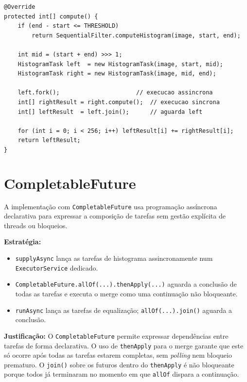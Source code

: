 \documentclass[a4paper,11pt,openright,BCOR=15mm]{scrbook}
\begin{document}
\begin{lstlisting}[caption={HistogramTask com Fork/Join}]
@Override
protected int[] compute() {
    if (end - start <= THRESHOLD)
        return SequentialFilter.computeHistogram(image, start, end);

    int mid = (start + end) >>> 1;
    HistogramTask left  = new HistogramTask(image, start, mid);
    HistogramTask right = new HistogramTask(image, mid, end);

    left.fork();                      // execucao assincrona
    int[] rightResult = right.compute();  // execucao sincrona
    int[] leftResult  = left.join();      // aguarda left

    for (int i = 0; i < 256; i++) leftResult[i] += rightResult[i];
    return leftResult;
}
\end{lstlisting}

\section{CompletableFuture}

A implementação com \texttt{CompletableFuture} usa programação assíncrona declarativa para expressar a composição de tarefas sem gestão explícita de threads ou bloqueios.

\textbf{Estratégia:}
\begin{itemize}
    \item \texttt{supplyAsync} lança as tarefas de histograma assincronamente num \texttt{ExecutorService} dedicado.
    \item \texttt{CompletableFuture.allOf(...).thenApply(...)} aguarda a conclusão de todas as tarefas e executa o merge como uma continuação não bloqueante.
    \item \texttt{runAsync} lança as tarefas de equalização; \texttt{allOf(...).join()} aguarda a conclusão.
\end{itemize}

\textbf{Justificação:} O \texttt{CompletableFuture} permite expressar dependências entre tarefas de forma declarativa. O uso de \texttt{thenApply} para o merge garante que este só ocorre após todas as tarefas estarem completas, sem \textit{polling} nem bloqueio prematuro. O \texttt{join()} sobre os futuros dentro do \texttt{thenApply} é não bloqueante porque todos já terminaram no momento em que \texttt{allOf} dispara a continuação.
\end{document}
